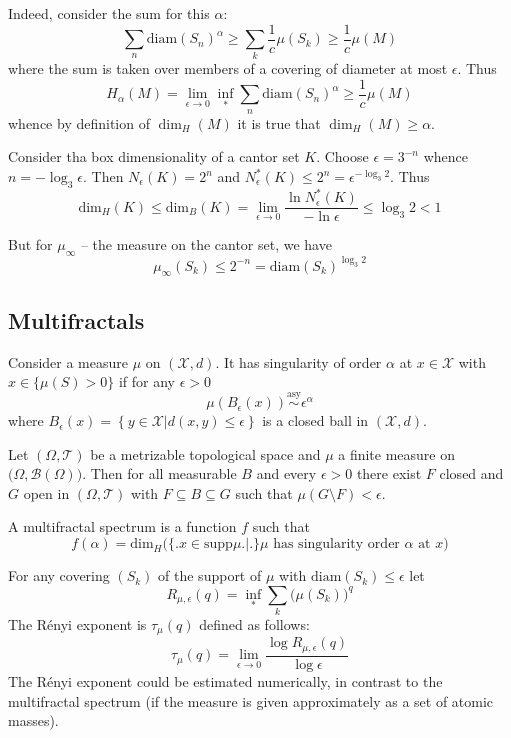 \documentclass[a4paper]{article}
\newcommand{\obj}[1]{{\left\{ #1 \right \}}}
\newcommand{\induc}[1]{{\left . #1 \right \vert}}
\newcommand{\Xcal}{\mathcal{X}}
\newcommand{\Tcal}{\mathcal{T}}
\newcommand{\borel}{\mathcal{B}}
\begin{document}
Indeed, consider the sum for this $\alpha$:
\[\sum_n \text{diam}(S_n)^\alpha \geq \sum_k \frac{1}{c} \mu(S_k) \geq \frac{1}{c} \mu(M)\]
where the sum is taken over members of a covering of diameter at most $\epsilon$. Thus
\[H_\alpha(M) = \lim_{\epsilon\to 0}\inf_* \sum_n \text{diam}(S_n)^\alpha \geq \frac{1}{c} \mu(M)\]
whence by definition of $\dim_H(M)$ it is true that $\dim_H(M) \geq \alpha$.


Consider tha box dimensionality of a cantor set $K$.
Choose $\epsilon = 3^{-n}$ whence $n=-\log_3 \epsilon$. Then $N_\epsilon(K) = 2^n$ and $N_\epsilon^*(K) \leq 2^n = \epsilon^{-\log_3 2}$. Thus
\[\text{dim}_H(K) \leq \text{dim}_B(K) = \lim_{\epsilon\to 0}\frac{\ln N_\epsilon^*(K)}{-\ln \epsilon}\leq \log_3 2 < 1\]

But for $\mu_\infty$ -- the measure on the cantor set, we have 
\[\mu_\infty(S_k) \leq 2^{-n} = \text{diam}(S_k)^{\log_3 2}\]

\subsection{Multifractals} %
\label{sub:multifractals}

Consider a measure $\mu$ on $(\Xcal, d)$. It has singularity of order $\alpha$ at $x\in \Xcal$ with $x\in \{\mu(S)>0\}$ if for any $\epsilon>0$
\[\mu(B_\epsilon(x)) \overset{\text{asy}}{\sim} \epsilon^\alpha\]
where $B_\epsilon(x) = \obj{\induc{y\in \Xcal}d(x,y)\leq\epsilon}$ is a closed ball in $(\Xcal, d)$.

Let $(\Omega, \Tcal)$ be a metrizable topological space and $\mu$ a finite measure on $\big(\Omega, \borel(\Omega)\big)$. Then for all measurable $B$ and every $\epsilon>0$ there exist $F$ closed and $G$ open in $(\Omega, \Tcal)$ with $F\subseteq B \subseteq G$ such that $\mu(G\setminus F) < \epsilon$.

A multifractal spectrum is a function $f$ such that 
\[f(\alpha) = \text{dim}_H\Big(\big\{\big. x\in \text{supp}\mu\big.\big\rvert \big.\big\} \mu \text{ has singularity order } \alpha \text{ at } x\Big)\]

For any covering $(S_k)$ of the support of $\mu$ with $\text{diam}(S_k)\leq \epsilon$ let
\[R_{\mu,\epsilon}(q) = \inf_* \sum_k \big(\mu(S_k)\big)^q\]
The R\'enyi exponent is $\tau_\mu(q)$ defined as follows:
\[\tau_\mu(q) = \lim_{\epsilon\to 0} \frac{\log R_{\mu,\epsilon}(q) }{\log \epsilon}\]
The R\'enyi exponent could be estimated numerically, in contrast to the multifractal spectrum (if the measure is given approximately as a set of atomic masses).
\end{document}
